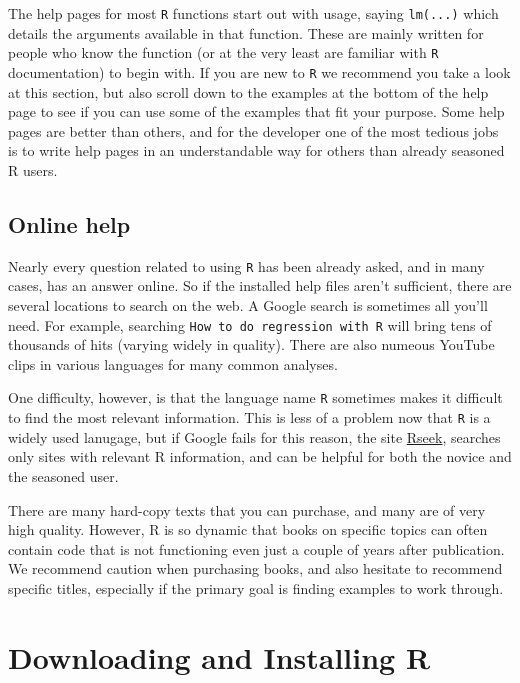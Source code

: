 \documentclass[letterpaper,]{book}
\begin{document}
The help pages for most \texttt{R} functions start out with usage, saying \texttt{lm(...)} which details the arguments available in that function. These are mainly written for people who know the function (or at the very least are familiar with \texttt{R} documentation) to begin with. If you are new to \texttt{R} we recommend you take a look at this section, but also scroll down to the examples at the bottom of the help page to see if you can use some of the examples that fit your purpose. Some help pages are better than others, and for the developer one of the most tedious jobs is to write help pages in an understandable way for others than already seasoned R users.

\hypertarget{online-help}{%
\subsection{Online help}\label{online-help}}

Nearly every question related to using \texttt{R} has been already asked, and in many cases, has an answer online. So if the installed help files aren't sufficient, there are several locations to search on the web. A Google search is sometimes all you'll need. For example, searching \texttt{How\ to\ do\ regression\ with\ R} will bring tens of thousands of hits (varying widely in quality). There are also numeous YouTube clips in various languages for many common analyses.

One difficulty, however, is that the language name \texttt{R} sometimes makes it difficult to find the most relevant information. This is less of a problem now that \texttt{R} is a widely used lanugage, but if Google fails for this reason, the site \href{http://www.rseek.org/}{Rseek}, searches only sites with relevant R information, and can be helpful for both the novice and the seasoned user.

There are many hard-copy texts that you can purchase, and many are of very high quality. However, R is so dynamic that books on specific topics can often contain code that is not functioning even just a couple of years after publication. We recommend caution when purchasing books, and also hesitate to recommend specific titles, especially if the primary goal is finding examples to work through.

\hypertarget{install}{%
\section{Downloading and Installing R}\label{install}}
\end{document}
